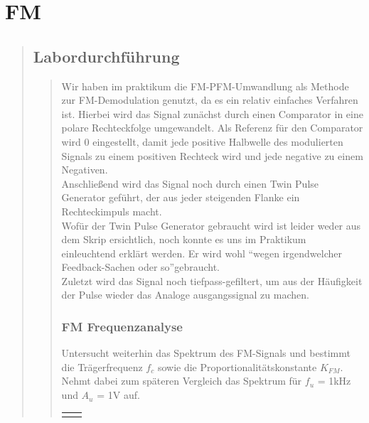 \section{FM}
\begin{quote}
    
    
    \subsection{Labordurchführung}
    \begin{quote}
        
        Wir haben im praktikum die FM-PFM-Umwandlung als Methode zur FM-Demodulation genutzt, da es ein relativ einfaches
        Verfahren ist. Hierbei wird das Signal zunächst durch einen Comparator in eine polare Rechteckfolge umgewandelt. Als
        Referenz für den Comparator wird \si{0}{\volt} eingestellt, damit jede positive Halbwelle des modulierten Signals zu
        einem positiven Rechteck wird und jede negative zu einem Negativen.\\
        Anschließend wird das Signal noch durch einen Twin Pulse Generator geführt, der aus jeder steigenden Flanke ein
        Rechteckimpuls macht.\\
        Wofür der Twin Pulse Generator gebraucht wird ist leider weder aus dem Skrip ersichtlich, noch konnte es uns im Praktikum
        einleuchtend erklärt werden. Er wird wohl ``wegen irgendwelcher Feedback-Sachen oder so''\footnotemark gebraucht.\\
        Zuletzt wird das Signal noch tiefpass-gefiltert, um aus der Häufigkeit der Pulse wieder das Analoge ausgangssignal zu
        machen.
        
        \subsubsection{FM Frequenzanalyse}
        Untersucht weiterhin das Spektrum des FM-Signals und bestimmt die Trägerfrequenz $f_c$ sowie die
        Proportionalitätskonstante $K_{FM}$. Nehmt dabei zum späteren Vergleich das Spektrum für $f_u$ = 1kHz und $A_u$ = 1V auf.
        
        
        \begin{center}
        \begin{tabular}{ll}
        
        \hspace{-3.3cm}
            \begin{minipage}{0.6\textwidth}
                

\end{minipage}
\end{tabular}
\end{center}
\end{quote}
\end{quote}
